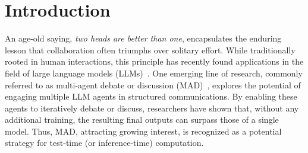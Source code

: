 
\section{Introduction}
An age-old saying, \emph{two heads are better than one}, encapsulates the enduring lesson that collaboration often triumphs over solitary effort. While traditionally rooted in human interactions, this principle has recently found applications in the field of large language models (LLMs)~\citep{chatgpt, instructgpt, vicuna, guanaco, chatglm}.
One emerging line of research, commonly referred to as multi-agent debate or discussion (MAD)~\cite{duimproving, yin2023exchange, liang2023encouraging, chen2023agentverse, chanchateval, wang2024rethinking, smit2023we}, explores the potential of engaging multiple LLM agents in structured communications. 
By enabling these agents to iteratively debate or discuss, researchers have shown that, without any additional training, the resulting final outputs can surpass those of a single model. Thus, MAD, attracting growing interest, is recognized as a potential strategy for test-time (or inference-time) computation. 

\begin{table*}[htb]
\caption{High-level comparison of MAD frameworks.}
\label{tab:mad_features}
\end{table*}

